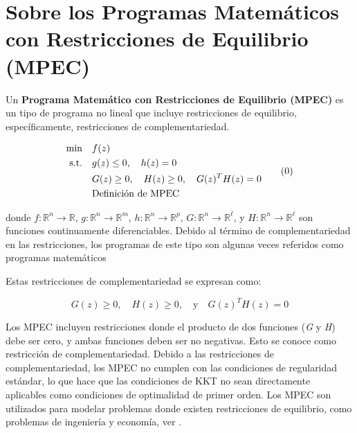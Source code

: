 \section{Sobre los Programas Matemáticos con Restricciones de Equilibrio (MPEC)}
Un \textbf{Programa Matemático con Restricciones de Equilibrio (MPEC)} es un tipo de programa no lineal que incluye restricciones de equilibrio, específicamente, restricciones de complementariedad.

\begin{equation}
\begin{aligned}
\min \quad & f(z) \notag \\
\text{s.t.} \quad & g(z) \leq 0, \quad h(z) = 0 \\
& G(z) \geq 0, \quad H(z) \geq 0, \quad G(z)^T H(z) = 0 \notag\\
&\text{Definición de MPEC} \notag\\
\end{aligned}  
\tag{\theequation} 
\label{eq:DefMpec}
\end{equation}

donde $f: \mathbb{R}^n \to \mathbb{R}$, $g: \mathbb{R}^n \to \mathbb{R}^m$, $h: \mathbb{R}^n \to \mathbb{R}^p$, $G: \mathbb{R}^n \to \mathbb{R}^\ell$, y $H: \mathbb{R}^n \to \mathbb{R}^\ell$ son funciones continuamente diferenciables. Debido al término de complementariedad en las restricciones, los programas de este tipo son algunas veces referidos como programas matemáticos

Estas restricciones de complementariedad se expresan como: 

\begin{equation}
    G(z) \geq 0, \quad H(z) \geq 0, \quad \text{y} \quad G(z)^T H(z) = 0 \label{eq:RestriccionesComplementariedadAbstracto}
\end{equation}

Los MPEC incluyen restricciones donde el producto de dos funciones (\textit{G} y \textit{H}) debe ser cero, y ambas funciones deben ser no negativas. Esto se conoce como restricción de complementariedad. Debido a las restricciones de complementariedad, los MPEC no cumplen con las condiciones de regularidad estándar, lo que hace que las condiciones de KKT no sean directamente aplicables como condiciones de optimalidad de primer orden. Los MPEC son utilizados para modelar problemas donde existen restricciones de equilibrio, como problemas de ingeniería y economía, ver \cite{Flegel2003AFJ,DempeyZemkoho2020}.


